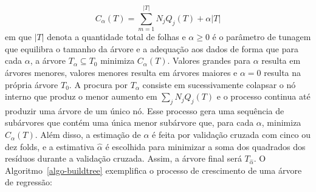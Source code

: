 \documentclass[
  12pt,
  letterpaper,
  DIV=11,
  numbers=noendperiod]{scrreprt}
\begin{document}
\[
C_{\alpha}\left(T\right) = \sum_{m = 1}^{|T|}N_jQ_j\left(T\right) + \alpha |T|
\] em que \(|T|\) denota a quantidade total de folhas e
\(\alpha \geq 0\) é o parâmetro de tunagem que equilibra o tamanho da
árvore e a adequação aos dados de forma que para cada \(\alpha\), a
árvore \(T_{\alpha} \subseteq T_0\) minimiza
\(C_{\alpha}\left(T\right)\). Valores grandes para \(\alpha\) resulta em
árvores menores, valores menores resulta em árvores maiores e
\(\alpha = 0\) resulta na própria árvore \(T_0\). A procura por
\(T_{\alpha}\) consiste em sucessivamente colapsar o nó interno que
produz o menor aumento em \(\sum_j N_j Q_j\left(T\right)\) e o processo
continua até produzir uma árvore de um único nó. Esse processo gera uma
sequência de subárvores que contém uma única menor subárvore que, para
cada \(\alpha\), minimiza \(C_{\alpha}\left(T\right)\). Além disso, a
estimação de \(\alpha\) é feita por validação cruzada com cinco ou dez
folds, e a estimativa \(\hat \alpha\) é escolhida para minimizar a soma
dos quadrados dos resíduos durante a validação cruzada. Assim, a árvore
final será \(T_{\hat \alpha}\). O  Algoritmo~\ref{algo-buildtree} 
exemplifica o processo de crescimento de uma árvore de regressão:
\end{document}
